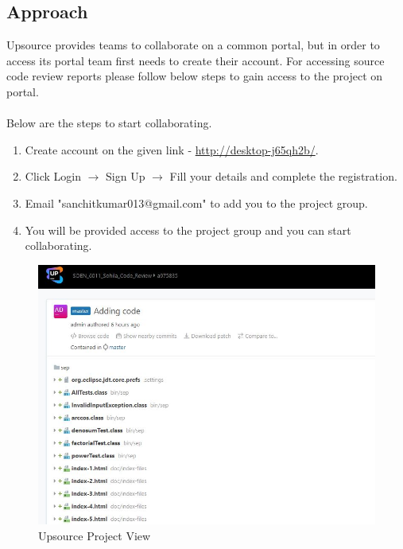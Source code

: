 \documentclass[a4paper,12pt]{article}
\begin{document}
\subsection{Approach}
Upsource provides teams to collaborate on a common portal, but in order to access its portal team first needs to create their account. For accessing source code review reports please follow below steps to gain access to the project on portal.
\\ \\
Below are the steps to start collaborating. 

\begin{enumerate}
	\item Create account on the given link - \url{http://desktop-j65qh2b/}.
	\item Click Login $\rightarrow$ Sign Up $\rightarrow$ Fill your details and complete the registration.
	\item Email "sanchitkumar013@gmail.com" to add you to the project group. 
	\item You will be provided access to the project group and you can start collaborating.
\end{enumerate}

\begin{figure}[htp]
	\centering
	\includegraphics[scale=1]{Project_View.jpg}
	\caption{Upsource Project View}
	\label{fig:galaxy}
\end{figure}
\end{document}
